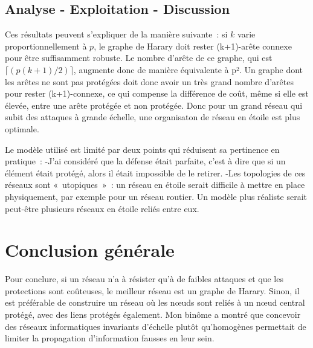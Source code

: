 \documentclass[12pt,a4paper]{article}
\begin{document}
\subsection{Analyse - Exploitation - Discussion}
Ces résultats peuvent s'expliquer de la manière suivante : si $k$ varie proportionnellement à $p$, le graphe de Harary doit rester (k+1)-arête connexe pour être suffisamment robuste. Le nombre d'arête de ce graphe, qui est $\lceil (p(k+1)/2) \rceil$, augmente donc de manière équivalente à  p². Un graphe dont les arêtes ne sont pas protégées doit donc avoir un très grand nombre d'arêtes pour rester (k+1)-connexe, ce qui compense la différence de coût, même si elle est élevée, entre une arête protégée et non protégée. Donc pour un grand réseau qui subit des attaques à grande échelle, une organisaton de réseau en étoile est plus optimale.

Le modèle utilisé est limité par deux points qui réduisent sa pertinence en pratique :
	-J'ai considéré que la défense était parfaite, c'est à dire que si un élément était protégé, alors il était impossible de le retirer.
	-Les topologies de ces réseaux sont « utopiques » : un réseau en étoile serait difficile à mettre en place physiquement, par exemple pour un réseau routier. Un modèle plus réaliste serait peut-être plusieurs réseaux en étoile reliés entre eux.
	
\section{Conclusion générale}
Pour conclure, si un réseau n'a à résister qu'à de faibles attaques et que les protections sont coûteuses,  le meilleur réseau est un graphe de Harary. Sinon, il est préférable de construire un réseau où les nœuds sont reliés à un nœud central protégé, avec des liens protégés également. Mon binôme a montré que concevoir des réseaux informatiques invariants d'échelle plutôt qu'homogènes permettait de limiter la propagation d'information fausses en leur sein.
\end{document}
